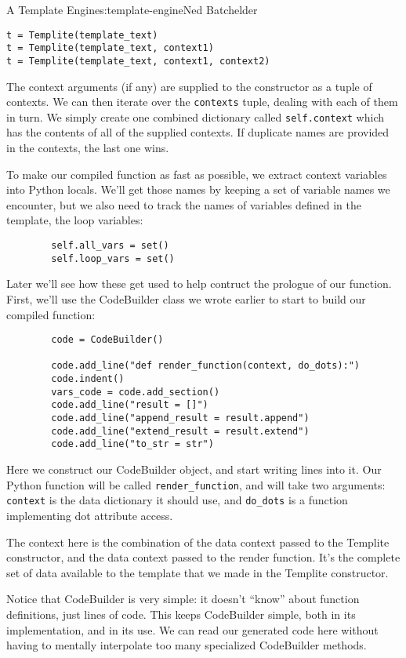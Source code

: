 \begin{aosachapter}{A Template Engine}{s:template-engine}{Ned Batchelder}
\begin{verbatim}
t = Templite(template_text)
t = Templite(template_text, context1)
t = Templite(template_text, context1, context2)
\end{verbatim}

The context arguments (if any) are supplied to the constructor as a
tuple of contexts. We can then iterate over the \texttt{contexts} tuple,
dealing with each of them in turn. We simply create one combined
dictionary called \texttt{self.context} which has the contents of all of
the supplied contexts. If duplicate names are provided in the contexts,
the last one wins.

To make our compiled function as fast as possible, we extract context
variables into Python locals. We'll get those names by keeping a set of
variable names we encounter, but we also need to track the names of
variables defined in the template, the loop variables:

\begin{verbatim}
        self.all_vars = set()
        self.loop_vars = set()
\end{verbatim}

Later we'll see how these get used to help contruct the prologue of our
function. First, we'll use the CodeBuilder class we wrote earlier to
start to build our compiled function:

\begin{verbatim}
        code = CodeBuilder()

        code.add_line("def render_function(context, do_dots):")
        code.indent()
        vars_code = code.add_section()
        code.add_line("result = []")
        code.add_line("append_result = result.append")
        code.add_line("extend_result = result.extend")
        code.add_line("to_str = str")
\end{verbatim}

Here we construct our CodeBuilder object, and start writing lines into
it. Our Python function will be called \texttt{render\_function}, and
will take two arguments: \texttt{context} is the data dictionary it
should use, and \texttt{do\_dots} is a function implementing dot
attribute access.

The context here is the combination of the data context passed to the
Templite constructor, and the data context passed to the render
function. It's the complete set of data available to the template that
we made in the Templite constructor.

Notice that CodeBuilder is very simple: it doesn't ``know'' about
function definitions, just lines of code. This keeps CodeBuilder simple,
both in its implementation, and in its use. We can read our generated
code here without having to mentally interpolate too many specialized
CodeBuilder methods.


\end{aosachapter}
